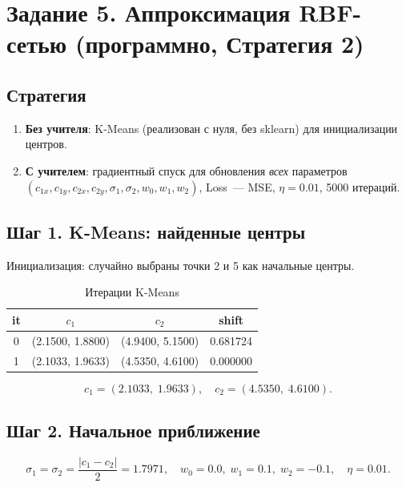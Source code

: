 \documentclass[12pt,a4paper]{article}
\begin{document}
\section{Задание 5. Аппроксимация RBF-сетью (программно, Стратегия 2)}

\subsection{Стратегия}

\begin{enumerate}
  \item \textbf{Без учителя}: K-Means (реализован с нуля, без sklearn) для инициализации центров.
  \item \textbf{С учителем}: градиентный спуск для обновления \emph{всех} параметров
        $(c_{1x}, c_{1y}, c_{2x}, c_{2y}, \sigma_1, \sigma_2, w_0, w_1, w_2)$,
        Loss~--- MSE, $\eta = 0.01$, 5000 итераций.
\end{enumerate}

\subsection{Шаг 1. K-Means: найденные центры}

Инициализация: случайно выбраны точки 2 и 5 как начальные центры.

\begin{table}[H]
\centering
\caption{Итерации K-Means}
\begin{tabular}{cccc}
\toprule
it & $c_1$ & $c_2$ & shift \\
\midrule
0 & (2.1500, 1.8800) & (4.9400, 5.1500) & 0.681724 \\
1 & (2.1033, 1.9633) & (4.5350, 4.6100) & 0.000000 \\
\bottomrule
\end{tabular}
\end{table}

\[
  \boxed{c_1 = (2.1033,\;1.9633), \quad c_2 = (4.5350,\;4.6100).}
\]

\subsection{Шаг 2. Начальное приближение}

\[
  \sigma_1 = \sigma_2 = \frac{|c_1 - c_2|}{2} = 1.7971, \quad
  w_0 = 0.0,\; w_1 = 0.1,\; w_2 = -0.1, \quad \eta = 0.01.
\]
\end{document}
